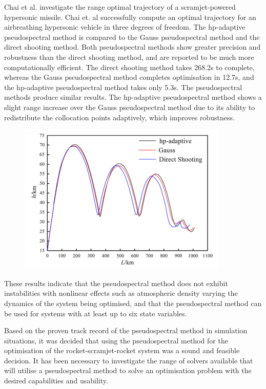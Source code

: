  Chai et al.\cite{Chai2015} investigate the range optimal trajectory of a scramjet-powered hypersonic missile. Chai et. al successfully compute an optimal trajectory for an airbreathing hypersonic vehicle in three degrees of freedom\cite{Chai2015}.  The hp-adaptive pseudospectral method is compared to the Gauss pseudospectral method and the direct shooting method. Both pseudospectral methods show greater precision and robustness than the direct shooting method, and are reported to be much more computationally efficient. The direct shooting method takes 268.2s to complete,
  whereas the Gauss pseudospectral method completes optimisation in 12.7s, and the hp-adaptive pseudospectral method takes only 5.3s\cite{Chai2015}. 
  The pseudospectral methods produce similar results. The hp-adaptive pseudospectral method shows a slight range increase over the Gauss pseudospectral method due to its ability to redistribute the collocation points adaptively, which improves robustness. 
 
 \begin{figure}
\centering
\includegraphics[width=0.7\linewidth]{figures/2_literature-review/OptimisationMethodComparisonChai}
\caption{}
\label{fig:OptimisationMethodComparisonChai}
\end{figure}


These results indicate that the pseudospectral method does not exhibit instabilities with nonlinear effects such as atmospheric density varying the dynamics of the system being optimised, and that the pseudospectral method can be used for systems with at least up to six state variables.

Based on the proven track record of the pseudospectral method in simulation situations, it was decided that using the pseudospectral method for the optimisation of the rocket-scramjet-rocket system was a sound and feasible decision. It has been necessary to investigate the range of solvers available that will utilise a pseudospectral method to solve an optimisation problem with the desired capabilities and usability. 

